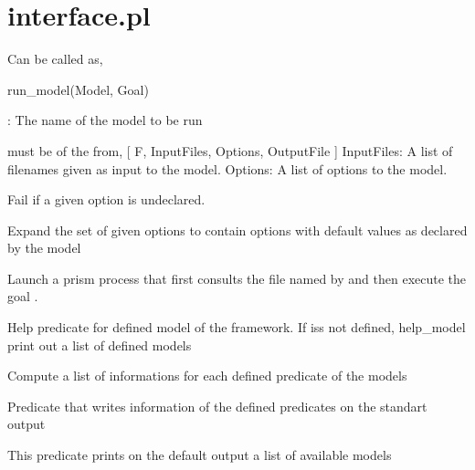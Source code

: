 


\section{interface.pl}

\label{sec:interface}

\begin{description}
Can be called as,

\begin{code}
run_model(Model, Goal)
\end{code}

: The name of the model to be run

 must be of the from,  \Suniv{} [ F, InputFiles, Options, OutputFile ]
InputFiles: A list of filenames given as input to the model.
Options: A list of options to the model.

Fail if a given option is undeclared.

Expand the set of given options to contain options with default
values as declared by the model

Launch a prism process that first consults
the file named by  and then
execute the goal .

Help predicate for defined model of the framework. If  iss not defined, help_model
print out a list of defined models

Compute a list of informations for each defined predicate of the models

Predicate that writes information of the defined predicates on the standart output

This predicate prints on the default output a list
of available models




\end{description}
